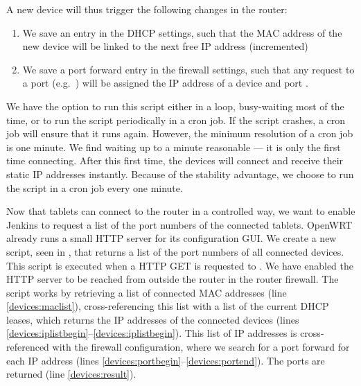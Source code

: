 A new device will thus trigger the following changes in the router:
\begin{enumerate}
  \item We save an entry in the DHCP settings, such that the MAC address of the new device will be linked to the next free IP address (incremented)
  \item We save a port forward entry in the firewall settings, such that any request to a port (e.g.\ ) will be assigned the IP address of a device and port .
\end{enumerate}

We have the option to run this script either in a loop, busy-waiting most of the time, or to run the script periodically in a cron job. If the script crashes, a cron job will ensure that it runs again. However, the minimum resolution of a cron job is one minute. We find waiting up to a minute reasonable --- it is only the first time connecting. After this first time, the devices will connect and receive their static IP addresses instantly. Because of the stability advantage, we choose to run the script in a cron job every one minute.




Now that tablets can connect to the router in a controlled way, we want to enable Jenkins to request a list of the port numbers of the connected tablets. OpenWRT already runs a small HTTP server for its configuration GUI\@. We create a new script, seen in , that returns a list of the port numbers of all connected devices. This script is executed when a HTTP GET is requested to . We have enabled the HTTP server to be reached from outside the router in the router firewall. The script works by retrieving a list of connected MAC addresses (line \ref{devices:maclist}), cross-referencing this list with a list of the current DHCP leases, which returns the IP addresses of the connected devices (lines \ref{devices:iplistbegin}--\ref{devices:iplistbegin}). This list of IP addresses is cross-referenced with the firewall configuration, where we search for a port forward for each IP address (lines \ref{devices:portbegin}--\ref{devices:portend}). The ports are returned (line \ref{devices:result}).

